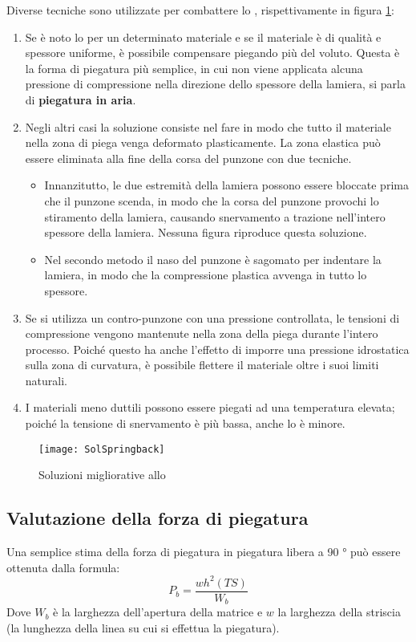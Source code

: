 Diverse tecniche sono utilizzate per combattere lo , rispettivamente in figura \ref{fig:SolSpringback}:
\begin{enumerate}
\item Se è noto lo  per un determinato materiale e se il materiale è di qualità e spessore uniforme, è possibile compensare piegando più del voluto. Questa è la forma di piegatura più semplice, in cui non viene applicata alcuna pressione di compressione nella direzione dello spessore della lamiera, si parla di \textbf{piegatura in aria}.
\item Negli altri casi la soluzione consiste nel fare in modo che tutto il materiale nella zona di piega venga deformato plasticamente. La zona elastica può essere eliminata alla fine della corsa del punzone con due tecniche.
	\begin{itemize}
	\item Innanzitutto, le due estremità della lamiera possono essere bloccate prima che il punzone scenda, in modo che la corsa del punzone provochi lo stiramento della lamiera, causando snervamento a trazione nell'intero spessore della lamiera. Nessuna figura riproduce questa soluzione.
	\item Nel secondo metodo il naso del punzone è sagomato per indentare la lamiera, in modo che la compressione plastica avvenga in tutto lo spessore.
	\end{itemize}
\item Se si utilizza un contro-punzone con una pressione controllata, le tensioni di compressione vengono mantenute nella zona della piega durante l'intero processo. Poiché questo ha anche l'effetto di imporre una pressione idrostatica sulla zona di curvatura, è possibile flettere il materiale oltre i suoi limiti naturali.
\item I materiali meno duttili possono essere piegati ad una temperatura elevata; poiché la tensione di snervamento è più bassa, anche lo  è minore.
\end{enumerate}

\begin{figure}
\centering
\texttt{[image: SolSpringback]}
\caption{Soluzioni migliorative allo }
\label{fig:SolSpringback}
\end{figure}

\subsection{Valutazione della forza di piegatura}
Una semplice stima della forza di piegatura in piegatura libera a 90 ° può essere ottenuta dalla formula:
\begin{equation}
P_b = \frac{wh^2 (TS)}{W_b}
\end{equation}
Dove $W_b$ è la larghezza dell'apertura della matrice e $w$ la larghezza della striscia (la lunghezza della linea su cui si effettua la piegatura).

